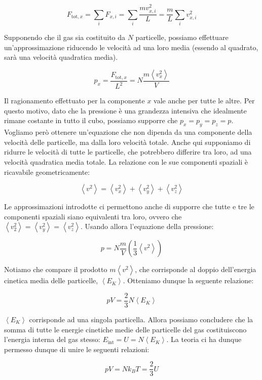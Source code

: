\[ F_{\text{tot}, x} = \sum_i F_{x,i} = \sum_i \frac{mv_{x,i}^2}{L} = \frac{m}{L}\sum_i v_{x,i}^2 \]

Supponendo che il gas sia costituito da $N$ particelle, possiamo
effettuare un'approssimazione riducendo le velocità ad una loro media
(essendo al quadrato, sarà una velocità quadratica media).

\[ p_x = \frac{F_{\text{tot},x}}{L^2} = N\frac{m\left\langle v_x^2 \right\rangle}{V} \]

Il ragionamento effettuato per la componente $x$ vale anche per tutte
le altre. Per questo motivo, dato che la pressione è una grandezza
intensiva che idealmente rimane costante in tutto il cubo, possiamo
supporre che $p_x = p_y = p_z = p$. Vogliamo però ottenere un'equazione
che non dipenda da una componente della velocità delle particelle,
ma dalla loro velocità totale. Anche qui supponiamo di ridurre le
velocità di tutte le particelle, che potrebbero differire tra loro,
ad una velocità quadratica media totale. La relazione con le sue
componenti spaziali è ricavabile geometricamente:

\[ \left\langle v^2 \right\rangle  = \left\langle v_x^2 \right\rangle + \left\langle v_y^2 \right\rangle + \left\langle v_z^2 \right\rangle \]

\noindent Le approssimazioni introdotte ci permettono anche di
supporre che tutte e tre le componenti spaziali siano equivalenti
tra loro, ovvero che $\left\langle v_2^2 \right\rangle = \left\langle v_y^2 \right\rangle = \left\langle v_z^2 \right\rangle$.
Usando allora l'equazione della pressione:

\[ p = N\frac{m}{V}\left(\frac13 \left\langle v^2 \right\rangle\right) \]

\noindent Notiamo che compare il prodotto $m\left\langle v^2 \right\rangle$, che
corrisponde al doppio dell'energia cinetica media delle particelle,
$\left\langle E_K \right\rangle$. Otteniamo dunque la seguente relazione:

\[ pV = \frac23 N\left\langle E_K \right\rangle \]

\noindent $\left\langle E_K \right\rangle$ corrisponde ad una singola particella.
Allora possiamo concludere che la somma di tutte le energie cinetiche
medie delle particelle del gas costituiscono l'energia interna del
gas stesso: $E_\text{int} = U = N\left\langle E_K \right\rangle$.
La teoria ci ha dunque permesso dunque di unire le seguenti relazioni:

\[ pV = Nk_BT = \frac23 U \]

